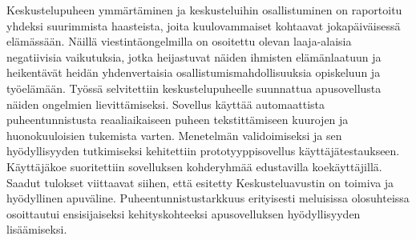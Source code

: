 \documentclass[english, 12pt, a4paper, pdftex, elec, utf8]{aaltothesis}
\begin{document}
\newpage

\begin{abstractpage}[finnish]
Keskustelupuheen ymmärtäminen ja keskusteluihin osallistuminen on raportoitu yhdeksi suurimmista haasteista, joita kuulovammaiset kohtaavat jokapäiväisessä elämässään. Näillä viestintäongelmilla on osoitettu olevan laaja-alaisia negatiivisia vaikutuksia, jotka heijastuvat näiden ihmisten elämänlaatuun ja heikentävät heidän yhdenvertaisia osallistumismahdollisuuksia opiskeluun ja työelämään. Työssä selvitettiin keskustelupuheelle suunnattua apusovellusta näiden ongelmien lievittämiseksi. Sovellus käyttää automaattista puheentunnistusta reaaliaikaiseen puheen tekstittämiseen kuurojen ja huonokuuloisien tukemista varten. Menetelmän validoimiseksi ja sen hyödyllisyyden tutkimiseksi kehitettiin prototyyppisovellus käyttäjätestaukseen. Käyttäjäkoe suoritettiin sovelluksen kohderyhmää edustavilla koekäyttäjillä. Saadut tulokset viittaavat siihen, että esitetty Keskusteluavustin on toimiva ja hyödyllinen apuväline. Puheentunnistustarkkuus erityisesti meluisissa olosuhteissa osoittautui ensisijaiseksi kehityskohteeksi apusovelluksen hyödyllisyyden lisäämiseksi. 
\end{abstractpage}

\newpage

\end{document}
